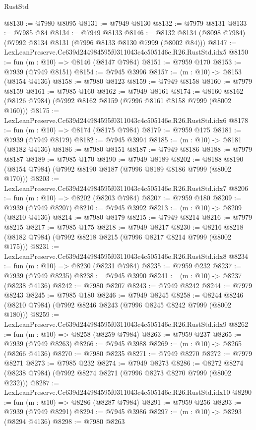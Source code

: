 \begin{lexlean}{RustStd}
\begin{coremodule}
@8130 := @7980 @8095
@8131 := @7949 @8130
@8132 := @7979 @8131
@8133 := @7985 @84
@8134 := @7949 @8133
@8146 := @8132 @8134 (@8098 @7984) (@7992 @8134 @8131 (@7996 @8133 @8130 @7999 (@8002 @84)))
@8147 := LexLeanPreserve.Cc639d244984595f0311043c4c505146e.R26.RustStd.idx5
@8150 := fun (m : @10) => @8146 (@8147 @7984)
@8151 := @7959 @170
@8153 := @7939 (@7949 @8151)
@8154 := @7945 @3996
@8157 := (m : @10) -> @8153 (@8154 @4136)
@8158 := @7980 @8123
@8159 := @7949 @8158
@8160 := @7979 @8159
@8161 := @7985 @160
@8162 := @7949 @8161
@8174 := @8160 @8162 (@8126 @7984) (@7992 @8162 @8159 (@7996 @8161 @8158 @7999 (@8002 @160)))
@8175 := LexLeanPreserve.Cc639d244984595f0311043c4c505146e.R26.RustStd.idx6
@8178 := fun (m : @10) => @8174 (@8175 @7984)
@8179 := @7959 @175
@8181 := @7939 (@7949 @8179)
@8182 := @7945 @3994
@8185 := (m : @10) -> @8181 (@8182 @4136)
@8186 := @7980 @8151
@8187 := @7949 @8186
@8188 := @7979 @8187
@8189 := @7985 @170
@8190 := @7949 @8189
@8202 := @8188 @8190 (@8154 @7984) (@7992 @8190 @8187 (@7996 @8189 @8186 @7999 (@8002 @170)))
@8203 := LexLeanPreserve.Cc639d244984595f0311043c4c505146e.R26.RustStd.idx7
@8206 := fun (m : @10) => @8202 (@8203 @7984)
@8207 := @7959 @180
@8209 := @7939 (@7949 @8207)
@8210 := @7945 @3992
@8213 := (m : @10) -> @8209 (@8210 @4136)
@8214 := @7980 @8179
@8215 := @7949 @8214
@8216 := @7979 @8215
@8217 := @7985 @175
@8218 := @7949 @8217
@8230 := @8216 @8218 (@8182 @7984) (@7992 @8218 @8215 (@7996 @8217 @8214 @7999 (@8002 @175)))
@8231 := LexLeanPreserve.Cc639d244984595f0311043c4c505146e.R26.RustStd.idx8
@8234 := fun (m : @10) => @8230 (@8231 @7984)
@8235 := @7959 @232
@8237 := @7939 (@7949 @8235)
@8238 := @7945 @3990
@8241 := (m : @10) -> @8237 (@8238 @4136)
@8242 := @7980 @8207
@8243 := @7949 @8242
@8244 := @7979 @8243
@8245 := @7985 @180
@8246 := @7949 @8245
@8258 := @8244 @8246 (@8210 @7984) (@7992 @8246 @8243 (@7996 @8245 @8242 @7999 (@8002 @180)))
@8259 := LexLeanPreserve.Cc639d244984595f0311043c4c505146e.R26.RustStd.idx9
@8262 := fun (m : @10) => @8258 (@8259 @7984)
@8263 := @7959 @237
@8265 := @7939 (@7949 @8263)
@8266 := @7945 @3988
@8269 := (m : @10) -> @8265 (@8266 @4136)
@8270 := @7980 @8235
@8271 := @7949 @8270
@8272 := @7979 @8271
@8273 := @7985 @232
@8274 := @7949 @8273
@8286 := @8272 @8274 (@8238 @7984) (@7992 @8274 @8271 (@7996 @8273 @8270 @7999 (@8002 @232)))
@8287 := LexLeanPreserve.Cc639d244984595f0311043c4c505146e.R26.RustStd.idx10
@8290 := fun (m : @10) => @8286 (@8287 @7984)
@8291 := @7959 @256
@8293 := @7939 (@7949 @8291)
@8294 := @7945 @3986
@8297 := (m : @10) -> @8293 (@8294 @4136)
@8298 := @7980 @8263

\end{coremodule}
\end{lexlean}
